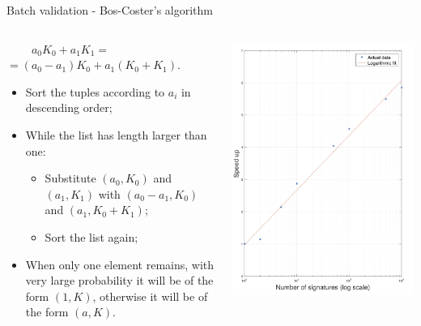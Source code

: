 \documentclass[slidescentered]{beamer}
\begin{document}
	\begin{frame}{Batch validation - Bos-Coster's algorithm}
		\begin{columns}
			\begin{column}{0.5\linewidth}
				$\ \ \ \ \ \ \ \ \ \ a_0K_0 + a_1K_1 =$ \\ $= (a_0 - a_1)K_0 + a_1(K_0 + K_1)$.
				
				\bigskip
				
				\pause
				\begin{itemize}
					\item<2 -> Sort the tuples according to $a_i$ in descending order;
					\item<3 -> While the list has length larger than one:
					\begin{itemize}
						\item<4 ->Substitute $(a_0, K_0)$ and $(a_1, K_1)$ with $(a_0 - a_1, K_0)$ and $(a_1, K_0 + K_1)$;
						\item<5 -> Sort the list again;
					\end{itemize}
					\item<6 -> When only one element remains, with very large probability it will be of the form $(1, K)$, otherwise it will be of the form $(a, K)$.
				\end{itemize}
			\end{column}
			\begin{column}{0.5\linewidth}
				\hspace*{0cm}
				\includegraphics[scale=0.31]{images/speedup}

\end{column}
\end{columns}
\end{frame}
\end{document}
